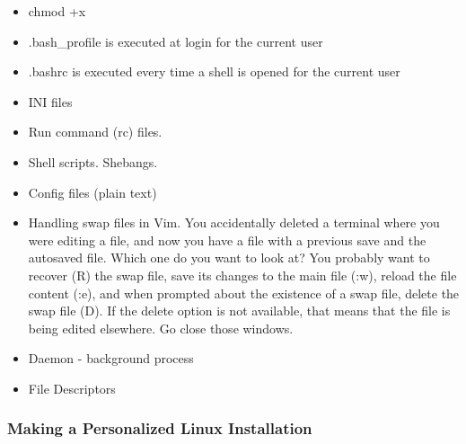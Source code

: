 


\begin{itemize}
	\item chmod +x
	\item .bash\_profile is executed at login for the current user
	\item .bashrc is executed every time a shell is opened for the current user
	\item INI files
	\item Run command (rc) files.
	\item Shell scripts. Shebangs.
	\item Config files (plain text)
	\item Handling swap files in Vim. You accidentally deleted a terminal where you were editing a file, and now you have a file with a previous save and the autosaved file. Which one do you want to look at? You probably want to recover (R) the swap file, save its changes to the main file (:w), reload the file content (:e), and when prompted about the existence of a swap file, delete the swap file (D). If the delete option is not available, that means that the file is being edited elsewhere. Go close those windows.
	\item Daemon - background process
	\item File Descriptors
\end{itemize}

\subsubsection{Making a Personalized Linux Installation}


